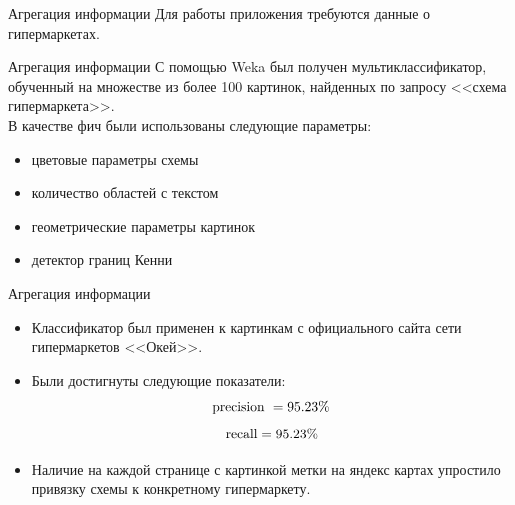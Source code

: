 \documentclass[11pt,slides,aspectratio=43]{beamer}%
\begin{document}
    \begin{frame}{Агрегация информации}
        Для работы приложения требуются данные о гипермаркетах.
    \end{frame}

    \begin{frame}{Агрегация информации}
            С помощью Weka был получен мультиклассификатор, обученный на множестве из более 100 картинок, найденных по запросу <<схема гипермаркета>>. \\
            В качестве фич были использованы следующие параметры:
            \begin{itemize}
                \item цветовые параметры схемы
                \item количество областей с текстом
                \item геометрические параметры картинок
                \item детектор границ Кенни
            \end{itemize}
    \end{frame}
    \begin{frame}{Агрегация информации}
        \begin{center}
            \begin{itemize}
                \item Классификатор был применен к картинкам с официального сайта сети гипермаркетов <<Окей>>.
                \item Были достигнуты следующие показатели: \\
                $$
                    \textnormal{precision }= 95.23 \%
                $$
                $$
                    \textnormal{recall} = 95.23 \%
                $$
                \item Наличие на каждой странице с картинкой метки на яндекс картах упростило привязку схемы к конкретному гипермаркету.
            \end{itemize}
        \end{center}
    \end{frame}
\end{document}

